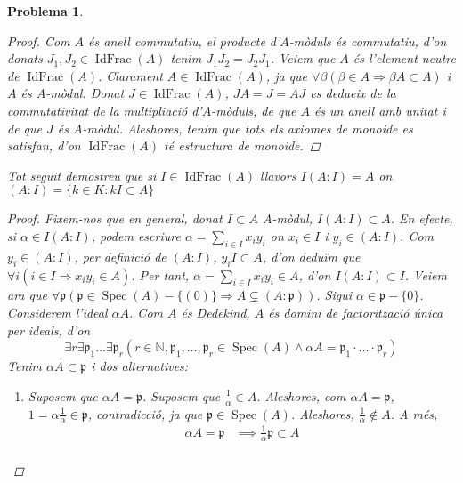 \documentclass{article}
\DeclareMathOperator{\Spec}{Spec}
\DeclareMathOperator{\IdFrac}{IdFrac}
\newtheorem{problema}{Problema}
\begin{document}
\begin{problema}
\begin{enumerate}
\begin{proof}
            Com $A$ és anell commutatiu, el producte d'$A$-mòduls és commutatiu, d'on donats $J_{1},J_{2}\in\IdFrac(A)$ tenim $J_{1}J_{2}=J_{2}J_{1}$.\newline
            Veiem que $A$ és l'element neutre de $\IdFrac(A)$. Clarament $A\in\IdFrac(A)$, ja que $\forall\beta(\beta\in A\Rightarrow\beta A\subset A)$ i $A$ és $A$-mòdul. Donat $J\in\IdFrac(A)$, $JA=J=AJ$ es dedueix de la commutativitat de la multipliació d'$A$-mòduls, de que $A$ és un anell amb unitat i de que $J$ és $A$-mòdul.\newline
            Aleshores, tenim que tots els axiomes de monoide es satisfan, d'on $\IdFrac(A)$ té estructura de monoide.
        \end{proof}
        Tot seguit demostreu que si $I\in\IdFrac(A)$ llavors $I(A:I)=A$ on $(A:I)=\{k\in K:kI\subset A\}$
        \begin{proof}
            Fixem-nos que en general, donat $I\subset A$ $A$-mòdul, $I(A:I)\subset A$. En efecte, si $\alpha\in I(A:I)$, podem escriure $\alpha=\sum_{i\in I}x_{i}y_{i}$ on $x_{i}\in I$ i $y_{i}\in(A:I)$. Com $y_{i}\in(A:I)$, per definició de $(A:I)$, $y_{i}I\subset A$, d'on deduïm que $\forall i(i\in I\Rightarrow x_{i}y_{i}\in A)$. Per tant, $\alpha=\sum_{i\in I}x_{i}y_{i}\in A$, d'on $I(A:I)\subset I$.\newline
            Veiem ara que $\forall\mathfrak{p}(\mathfrak{p}\in\Spec(A)-\{(0)\}\Rightarrow A\subsetneq(A:\mathfrak{p}))$. Sigui $\alpha\in\mathfrak{p}-\{0\}$. Considerem l'ideal $\alpha A$. Com $A$ és Dedekind, $A$ és domini de factorització única per ideals, d'on
            \begin{equation*}
                \exists r\exists\mathfrak{p}_{1}\ldots\exists\mathfrak{p}_{r}(r\in\mathbb{N},\mathfrak{p}_{1},\ldots,\mathfrak{p}_{r}\in\Spec(A)\land\alpha A=\mathfrak{p}_{1}\cdot\ldots\cdot\mathfrak{p}_{r})
            \end{equation*}
            Tenim $\alpha A\subset\mathfrak{p}$ i dos alternatives:
            \begin{enumerate}
                \item Suposem que $\alpha A=\mathfrak{p}$. Suposem que $\frac{1}{\alpha}\in A$. Aleshores, com $\alpha A=\mathfrak{p}$, $1=\alpha\frac{1}{\alpha}\in\mathfrak{p}$, contradicció, ja que $\mathfrak{p}\in\Spec(A)$. Aleshores, $\frac{1}{\alpha}\notin A$. A més,
                \begin{align*}
                    \alpha A=\mathfrak{p}
                    &\implies\tfrac{1}{\alpha}\mathfrak{p}\subset A\\

\end{align*}
\end{enumerate}
\end{proof}
\end{enumerate}
\end{problema}
\end{document}
